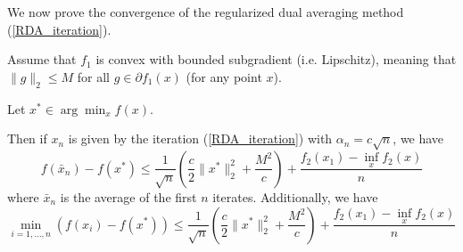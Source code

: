 We now prove the convergence of the regularized dual averaging method (\ref{RDA_iteration}).
\begin{theorem}
 Assume that $f_1$ is convex with bounded subgradient (i.e. Lipschitz), meaning that $\|g\|_2 \leq M$ for all $g\in \partial f_1(x)$ (for any point $x$).
 
 Let $x^*\in \arg\min_x f(x)$.
 
 Then if $x_n$ is given by the iteration (\ref{RDA_iteration}) with $\alpha_n = c\sqrt{n}$, we have
 \begin{equation}
  f(\bar{x}_n) - f(x^*) \leq \frac{1}{\sqrt{n}}\left(\frac{c}{2}\|x^*\|_2^2 + \frac{M^2}{c}\right) + \frac{f_2(x_1) - \inf_x f_2(x)}{n}
 \end{equation}
 where $\bar{x}_n$ is the average of the first $n$ iterates. Additionally, we have
 \begin{equation}
  \min_{i = 1,...,n} (f(x_i) - f(x^*)) \leq \frac{1}{\sqrt{n}}\left(\frac{c}{2}\|x^*\|_2^2 + \frac{M^2}{c}\right) + \frac{f_2(x_1) - \inf_x f_2(x)}{n}
 \end{equation}
\end{theorem}

